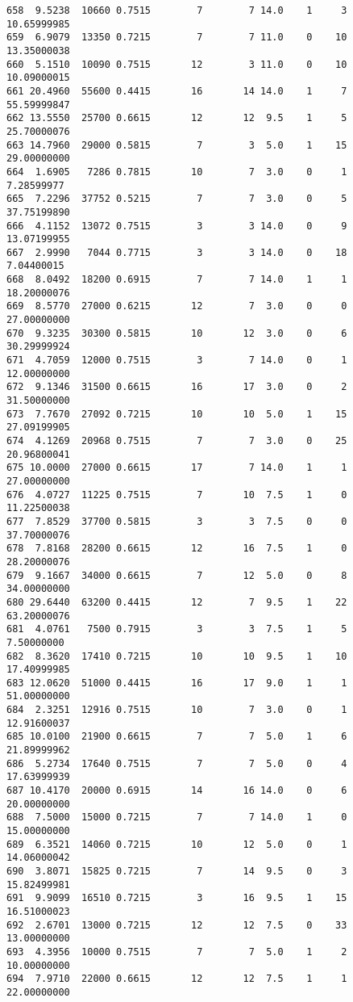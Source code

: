 \documentclass[
  letterpaper,
  DIV=11,
  numbers=noendperiod]{scrreprt}
\begin{document}
\begin{verbatim}
658  9.5238  10660 0.7515        7        7 14.0    1     3 10.65999985
659  6.9079  13350 0.7215        7        7 11.0    0    10 13.35000038
660  5.1510  10090 0.7515       12        3 11.0    0    10 10.09000015
661 20.4960  55600 0.4415       16       14 14.0    1     7 55.59999847
662 13.5550  25700 0.6615       12       12  9.5    1     5 25.70000076
663 14.7960  29000 0.5815        7        3  5.0    1    15 29.00000000
664  1.6905   7286 0.7815       10        7  3.0    0     1  7.28599977
665  7.2296  37752 0.5215        7        7  3.0    0     5 37.75199890
666  4.1152  13072 0.7515        3        3 14.0    0     9 13.07199955
667  2.9990   7044 0.7715        3        3 14.0    0    18  7.04400015
668  8.0492  18200 0.6915        7        7 14.0    1     1 18.20000076
669  8.5770  27000 0.6215       12        7  3.0    0     0 27.00000000
670  9.3235  30300 0.5815       10       12  3.0    0     6 30.29999924
671  4.7059  12000 0.7515        3        7 14.0    0     1 12.00000000
672  9.1346  31500 0.6615       16       17  3.0    0     2 31.50000000
673  7.7670  27092 0.7215       10       10  5.0    1    15 27.09199905
674  4.1269  20968 0.7515        7        7  3.0    0    25 20.96800041
675 10.0000  27000 0.6615       17        7 14.0    1     1 27.00000000
676  4.0727  11225 0.7515        7       10  7.5    1     0 11.22500038
677  7.8529  37700 0.5815        3        3  7.5    0     0 37.70000076
678  7.8168  28200 0.6615       12       16  7.5    1     0 28.20000076
679  9.1667  34000 0.6615        7       12  5.0    0     8 34.00000000
680 29.6440  63200 0.4415       12        7  9.5    1    22 63.20000076
681  4.0761   7500 0.7915        3        3  7.5    1     5  7.50000000
682  8.3620  17410 0.7215       10       10  9.5    1    10 17.40999985
683 12.0620  51000 0.4415       16       17  9.0    1     1 51.00000000
684  2.3251  12916 0.7515       10        7  3.0    0     1 12.91600037
685 10.0100  21900 0.6615        7        7  5.0    1     6 21.89999962
686  5.2734  17640 0.7515        7        7  5.0    0     4 17.63999939
687 10.4170  20000 0.6915       14       16 14.0    0     6 20.00000000
688  7.5000  15000 0.7215        7        7 14.0    1     0 15.00000000
689  6.3521  14060 0.7215       10       12  5.0    0     1 14.06000042
690  3.8071  15825 0.7215        7       14  9.5    0     3 15.82499981
691  9.9099  16510 0.7215        3       16  9.5    1    15 16.51000023
692  2.6701  13000 0.7215       12       12  7.5    0    33 13.00000000
693  4.3956  10000 0.7515        7        7  5.0    1     2 10.00000000
694  7.9710  22000 0.6615       12       12  7.5    1     1 22.00000000

\end{verbatim}
\end{document}
